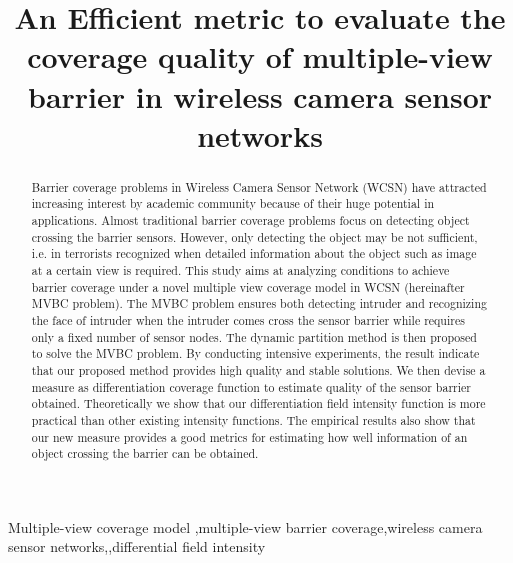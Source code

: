 \documentclass[3p]{elsarticle}
\begin{document}
\begin{frontmatter}

\title{ An Efficient metric to evaluate the coverage quality of multiple-view barrier in wireless camera sensor networks}


\begin{abstract}
Barrier coverage problems in Wireless Camera Sensor Network (WCSN) have attracted increasing interest by academic community because of their huge potential in applications. Almost traditional barrier coverage problems focus on detecting object crossing the barrier sensors. However, only detecting the object may be not sufficient, i.e. in terrorists recognized when detailed information about the object such as image at a certain view is required. This study aims at analyzing conditions to achieve barrier coverage under a novel multiple view coverage model in WCSN (hereinafter MVBC problem). The MVBC problem ensures both detecting intruder and recognizing the face of intruder when the intruder comes cross the sensor barrier while requires only a fixed number of sensor nodes. The dynamic partition method is then proposed to solve the MVBC problem. By conducting intensive experiments, the result indicate that our proposed method provides high quality and stable solutions. We then devise a measure as differentiation coverage function to estimate quality of the sensor barrier obtained. Theoretically we show that our differentiation field intensity function is more practical than other existing intensity functions. The empirical results also show that our new measure provides a good metrics for estimating how well information of an object crossing the barrier can be obtained.
\end{abstract}

\begin{keyword}
Multiple-view coverage model \sep multiple-view barrier coverage\sep wireless camera sensor networks\sep \sep differential field intensity
\end{keyword}

\end{frontmatter}
\end{document}
